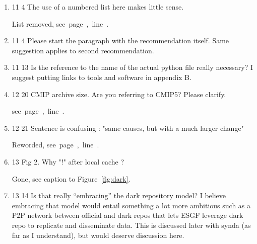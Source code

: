 \documentclass[gmd,manuscript]{copernicus}
\newcommand{\plref}[1]{\mbox{see page \pageref{p-#1}, line
    \lineref{l-#1}.}}
\newenvironment{answer}{\color{blue}}{}
\begin{document}
\begin{enumerate}[label=RC2-\arabic*,leftmargin=*]
  \begin{answer}
    The data volume discussion has been rewritten, see
    Section~\ref{sec:dvol}. As regards the second point, it is no
    doubt true that many of the variables exhibit considerable
    covariance, and are not statistically independent. But this
    remains still a matter for analysis and discovery. The current
    1-variable-file remains a useful unit of analysis, a compromise
    for most users between too large files and too many files. Future
    infrastructure may indeed move in other directions based on the
    outcomes of CMIP6, and indeed POSIX ``files'' may themselves
    become obsolete, under certain technological evolutionary
    pathways currently at the cutting edge. We have added some
    discussion of these issues in the Conclusion.
  \end{answer}
\item 11 4 The use of a numbered list here makes little sense.

  \begin{answer}
    List removed, \plref{RC2-21}
  \end{answer}
\item 11 4 Please start the paragraph with the recommendation itself.
  Same suggestion applies to second recommendation.
\item 11 13 Is the reference to the name of the actual python file
  really necessary? I suggest putting links to tools and software in
  appendix B.
\item 12 20 CMIP archive size. Are you referring to CMIP5? Please
  clarify.

  \begin{answer}
    \plref{RC1-28}
  \end{answer}
\item 12 21 Sentence is confusing : "same causes, but with a much
  larger change"

  \begin{answer}
    Reworded, \plref{RC1-29b}
  \end{answer}
\item 13 Fig 2. Why "!" after local cache ?

  \begin{answer}
    Gone, see caption to Figure~\ref{fig:dark}.
  \end{answer}
\item 13 14 Is that really ``embracing'' the dark repository model? I
  believe embracing that model would entail something a lot more
  ambitious such as a P2P network between official and dark repos that
  lets ESGF leverage dark repo to replicate and disseminate data. This
  is discussed later with synda (as far as I understand), but would
  deserve discussion here.


\end{enumerate}
\end{document}
